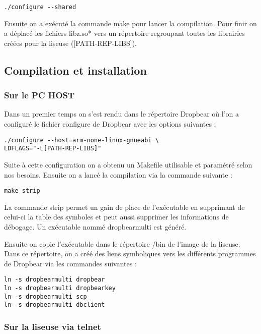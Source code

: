 \begin{lstlisting}
./configure --shared
\end{lstlisting}

Ensuite on a exécuté la commande make pour lancer la compilation.
Pour finir on a déplacé les fichiers libz.so* vers un répertoire regroupant toutes les librairies créées pour la liseuse ([PATH-REP-LIBS]). 

\subsection{Compilation et installation}

\subsubsection{Sur le PC HOST}

Dans un premier temps on s'est rendu dans le répertoire Dropbear où l'on a configuré le fichier configure de Dropbear avec les options suivantes :

\begin{lstlisting}
./configure --host=arm-none-linux-gnueabi \
LDFLAGS="-L[PATH-REP-LIBS]"
\end{lstlisting} 

Suite à cette configuration on a obtenu un Makefile utilisable et paramétré selon nos besoins.
Ensuite on a lancé la compilation via la commande suivante :

\begin{lstlisting}
make strip
\end{lstlisting}

La commande strip permet un gain de place de l'exécutable en supprimant de celui-ci la table des symboles et peut aussi supprimer les informations de débogage. Un exécutable nommé dropbearmulti est généré.

Ensuite on copie l'exécutable dans le répertoire /bin de l'image de la liseuse. Dans ce répertoire, on a créé des liens symboliques vers les différents programmes de Dropbear via les commandes suivantes :

\begin{lstlisting}
ln -s dropbearmulti dropbear
ln -s dropbearmulti dropbearkey
ln -s dropbearmulti scp
ln -s dropbearmulti dbclient
\end{lstlisting}  

\subsubsection{Sur la liseuse via telnet}

